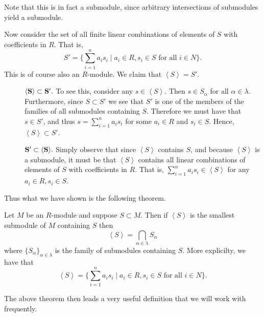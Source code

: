 Note that this is in fact a submodule,
since arbitrary intersections of submodules yield a submodule. 

Now consider the set of all finite linear combinations of elements
of $S$ with coefficients in $R$. That is, 
\[
    S' = \Big\{\sum_{i = 1}^{n} a_is_i \mid a_i \in R, s_i \in S \text{ for all } i \in N\Big\}. 
\]
This is of course also an $R$-module. We claim that $\left< S
\right> = S'$.
\begin{description}
    \item[\phantom{meow}]$\bf{\left< S \right> \subset S'.}$ To
    see this, consider any $s \in \left<S\right>$. Then $s \in
    S_{\alpha}$ for all $\alpha \in \lambda$. Furthermore, since
    $S \subset S'$ we see that $S'$ is one of the members of the
    families of all submodules containing $S$. Therefore we must
    have that $s \in S'$, and thus $\displaystyle s = \sum_{i = 1}^{n}a_is_i$
    for some $a_i \in R$ and $s_i \in S$. Hence, $\left<S
    \right> \subset S'$.
    
    \item[\phantom{meow}]$\bf{S' \subset \left< S \right>}.$
    Simply observe that since $\left< S \right>$ contains $S$, and
    because $\left< S \right>$ is a submodule,
    it must be that $\left< S \right>$ contains all linear combinations of
    elements of $S$ with coefficients in $R$. That is,
    $\displaystyle \sum_{i = 1}^{n} a_is_i \in \left< S \right>$
    for any $a_i \in R, s_i \in S$. 
\end{description}

Thus what we have shown is the following theorem. 
\begin{thm}\label{submodule_intersection_theorem}
    Let $M$ be an $R$-module and suppose $S \subset M$. Then if
    $\left< S \right>$ is the smallest submodule of $M$ containing
    $S$ then 
    \[
        \left< S \right> = \bigcap_{\alpha \in \lambda} S_\alpha
    \]
    where $\{S_\alpha\}_{\alpha \in \lambda}$ is the family of
    submodules containing $S$. More explicilty, we have that 
    \[
        \left< S \right> = \Big\{\sum_{i = 1}^{n} a_is_i \mid a_i \in R, s_i \in S \text{ for all } i \in N\Big\}.
    \]
    \vspace{-0.7cm}
\end{thm}

The above theorem then leads a very useful definition that we will
work with frequently. 

